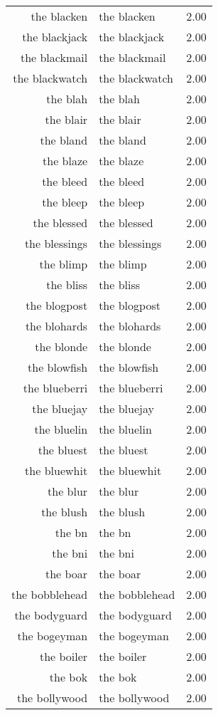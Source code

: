 \begin{table}[ht]
\begin{tabular}{rlr}
  the blacken & the blacken & 2.00 \\ 
  the blackjack & the blackjack & 2.00 \\ 
  the blackmail & the blackmail & 2.00 \\ 
  the blackwatch & the blackwatch & 2.00 \\ 
  the blah & the blah & 2.00 \\ 
  the blair & the blair & 2.00 \\ 
  the bland & the bland & 2.00 \\ 
  the blaze & the blaze & 2.00 \\ 
  the bleed & the bleed & 2.00 \\ 
  the bleep & the bleep & 2.00 \\ 
  the blessed & the blessed & 2.00 \\ 
  the blessings & the blessings & 2.00 \\ 
  the blimp & the blimp & 2.00 \\ 
  the bliss & the bliss & 2.00 \\ 
  the blogpost & the blogpost & 2.00 \\ 
  the blohards & the blohards & 2.00 \\ 
  the blonde & the blonde & 2.00 \\ 
  the blowfish & the blowfish & 2.00 \\ 
  the blueberri & the blueberri & 2.00 \\ 
  the bluejay & the bluejay & 2.00 \\ 
  the bluelin & the bluelin & 2.00 \\ 
  the bluest & the bluest & 2.00 \\ 
  the bluewhit & the bluewhit & 2.00 \\ 
  the blur & the blur & 2.00 \\ 
  the blush & the blush & 2.00 \\ 
  the bn & the bn & 2.00 \\ 
  the bni & the bni & 2.00 \\ 
  the boar & the boar & 2.00 \\ 
  the bobblehead & the bobblehead & 2.00 \\ 
  the bodyguard & the bodyguard & 2.00 \\ 
  the bogeyman & the bogeyman & 2.00 \\ 
  the boiler & the boiler & 2.00 \\ 
  the bok & the bok & 2.00 \\ 
  the bollywood & the bollywood & 2.00 \\ 

\end{tabular}
\end{table}
